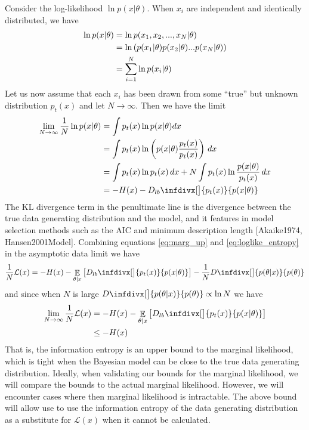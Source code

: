 \documentclass{article}
\DeclareMathOperator{\Ex}{\mathbb{E}}%
\newcommand{\infdiv}{D\infdivx}
\newcommand{\infdivlb}{D_{lb}\infdivx}
\begin{document}
Consider the log-likelihood $\ln p(x|\theta)$. When $x_i$ are independent and identically distributed, we have
\begin{align}
    \ln p(x|\theta) & = \ln p(x_1, x_2, ..., x_N|\theta) \notag\\
    &= \ln \left( p(x_1|\theta) p(x_2|\theta) ... p(x_N|\theta) \right) \notag\\
    &= \sum_{i=1}^N \ln p(x_i|\theta) \notag
\end{align}
Let us now assume that each $x_i$ has been drawn from some ``true'' but unknown distribution $p_t(x)$ and let $N\rightarrow\infty$. Then we have the limit
\begin{align}
    \lim_{N \rightarrow \infty} \frac{1}{N}\ln p(x|\theta) &= \int p_t(x) \ln p(x|\theta) dx \notag\\
    &= \int p_t(x)\ln \left ( p(x|\theta) \frac{p_t(x)}{p_t(x)} \right) \, dx  \notag\\
    &= \int p_t(x)\ln p_t(x) \, dx + N \int p_t(x)\ln \frac{p(x|\theta)}{p_t(x)} \, dx \notag\\
    &= - H(x) - \infdivlb[\big]{p_t(x)}{p(x|\theta)} \label{eq:loglike_entropy}
\end{align}
The KL divergence term in the penultimate line is the divergence between the true data generating distribution and the model, and it features in model selection methods such as the AIC and minimum description length [Akaike1974, Hansen2001Model]. Combining equations \ref{eq:marg_up} and \ref{eq:loglike_entropy} in the asymptotic data limit we have
\begin{align}
\frac{1}{N}\mathcal{L}(x) = - H(x) - \Ex_{\theta | x} \left[ \infdivlb[\big]{p_t(x)}{p(x|\theta)}\right] - \frac{1}{N}\infdiv[\big]{p(\theta | x)}{p(\theta)}
\end{align}
and since when $N$ is large $\infdiv[\big]{p(\theta | x)}{p(\theta)} \propto \ln N$ we have
\begin{align}
\lim_{N \rightarrow \infty} \frac{1}{N}\mathcal{L}(x) &= - H(x) - \Ex_{\theta | x} \left[ \infdivlb[\big]{p_t(x)}{p(x|\theta)} \right]\\
&\leq - H(x)
\end{align}
That is, the information entropy is an upper bound to the marginal likelihood, which is tight when the Bayesian model can be close to the true data generating distribution. Ideally, when validating our bounds for the marginal likelihood, we will compare the bounds to the actual marginal likelihood. However, we will encounter cases where then marginal likelihood is intractable. The above bound will allow use to use the information entropy of the data generating distribution as a substitute for $\mathcal{L}(x)$ when it cannot be calculated. 
\end{document}
